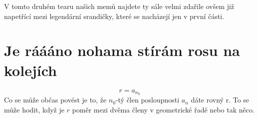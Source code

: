 V tomto druhém tearu našich memů najdete ty sále velmi zdařile ovšem již
napetřící mezi legendární srandičky, které se nacházejí jen v první části.

\section{Je ráááno nohama stírám rosu na kolejích}
\label{sec:je-raaano-nohama-stiram-rosu-na-kolejich}
\[
 r=a_{n_0}
\]
Co se může občas povést je to, že $n_0$-tý člen posloupnosti $a_n$ dáte rovný
r. To se může hodit, když je $r$ poměr mezi dvěma členy v geometrické řadě nebo
tak něco. 
